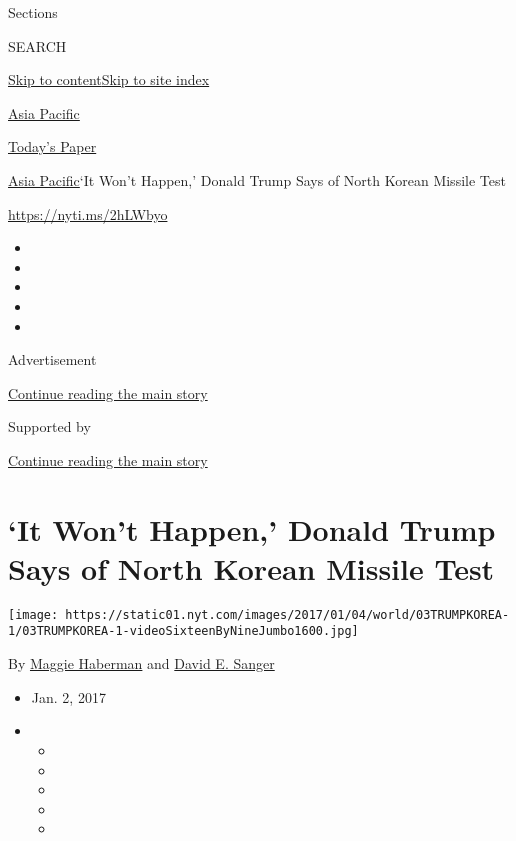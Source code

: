 Sections

SEARCH

\protect\hyperlink{site-content}{Skip to
content}\protect\hyperlink{site-index}{Skip to site index}

\href{https://www.nytimes.com/section/world/asia}{Asia Pacific}

\href{https://myaccount.nytimes.com/auth/login?response_type=cookie\&client_id=vi}{}

\href{https://www.nytimes.com/section/todayspaper}{Today's Paper}

\href{/section/world/asia}{Asia Pacific}\textbar{}`It Won't Happen,'
Donald Trump Says of North Korean Missile Test

\url{https://nyti.ms/2hLWbyo}

\begin{itemize}
\item
\item
\item
\item
\item
\end{itemize}

Advertisement

\protect\hyperlink{after-top}{Continue reading the main story}

Supported by

\protect\hyperlink{after-sponsor}{Continue reading the main story}

\hypertarget{it-wont-happen-donald-trump-says-of-north-korean-missile-test}{%
\section{`It Won't Happen,' Donald Trump Says of North Korean Missile
Test}\label{it-wont-happen-donald-trump-says-of-north-korean-missile-test}}

\texttt{[image: https://static01.nyt.com/images/2017/01/04/world/03TRUMPKOREA-1/03TRUMPKOREA-1-videoSixteenByNineJumbo1600.jpg]}

By \href{http://www.nytimes.com/by/maggie-haberman}{Maggie Haberman} and
\href{http://www.nytimes.com/by/david-e-sanger}{David E. Sanger}

\begin{itemize}
\item
  Jan. 2, 2017
\item
  \begin{itemize}
  \item
  \item
  \item
  \item
  \item
  \end{itemize}
\end{itemize}

